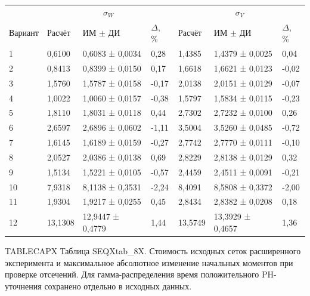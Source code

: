 \setlength{\tabcolsep}{2pt}
\begin{tabular}{p{4.16cm}p{1.61cm}p{2.83cm}p{1.28cm}p{1.61cm}p{2.83cm}p{1.28cm}}
\toprule
 & \multicolumn{3}{c}{$\sigma_W$} & \multicolumn{3}{c}{$\sigma_V$} \\
Вариант & Расчёт & ИМ $\pm$ ДИ & $\Delta$, \% & Расчёт & ИМ $\pm$ ДИ & $\Delta$, \% \\
\midrule
1 & 0,6100 & 0,6083 ± 0,0034 & 0,28 & 1,4385 & 1,4379 ± 0,0025 & 0,04 \\
2 & 0,8413 & 0,8399 ± 0,0150 & 0,17 & 1,6618 & 1,6621 ± 0,0123 & -0,02 \\
3 & 1,5760 & 1,5787 ± 0,0158 & -0,17 & 2,0138 & 2,0151 ± 0,0129 & -0,07 \\
4 & 1,0022 & 1,0060 ± 0,0157 & -0,38 & 1,5797 & 1,5834 ± 0,0115 & -0,23 \\
5 & 1,8110 & 1,8031 ± 0,0118 & 0,44 & 2,7302 & 2,7232 ± 0,0100 & 0,26 \\
6 & 2,6597 & 2,6896 ± 0,0602 & -1,11 & 3,5004 & 3,5260 ± 0,0485 & -0,72 \\
7 & 1,6145 & 1,6189 ± 0,0159 & -0,27 & 2,7742 & 2,7770 ± 0,0111 & -0,10 \\
8 & 2,0527 & 2,0386 ± 0,0138 & 0,69 & 2,8229 & 2,8138 ± 0,0129 & 0,32 \\
9 & 1,5134 & 1,5221 ± 0,0105 & -0,57 & 2,4459 & 2,4511 ± 0,0091 & -0,21 \\
10 & 7,9318 & 8,1138 ± 0,3531 & -2,24 & 8,4091 & 8,5808 ± 0,3372 & -2,00 \\
11 & 1,9304 & 1,9217 ± 0,0255 & 0,45 & 2,8434 & 2,8382 ± 0,0208 & 0,18 \\
12 & 13,1308 & 12,9447 ± 0,4779 & 1,44 & 13,5749 & 13,3929 ± 0,4657 & 1,36 \\
\bottomrule
\end{tabular}




\noindent TABLECAPX Таблица SEQXtab_8X. Стоимость исходных сеток расширенного эксперимента и максимальное абсолютное изменение начальных моментов при проверке отсечений. Для гамма-распределения время положительного PH-уточнения сохранено отдельно в исходных данных.\par

